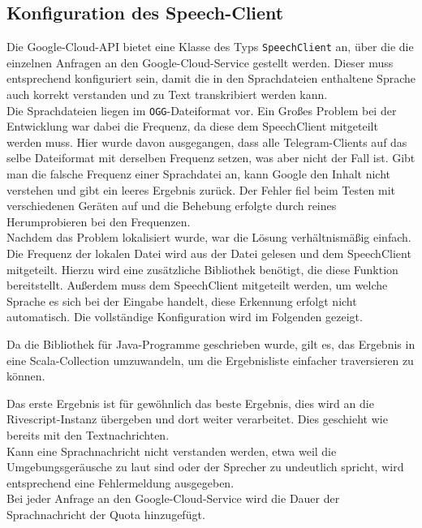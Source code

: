 \subsection{Konfiguration des Speech-Client}
Die Google-Cloud-API bietet eine Klasse des Typs \texttt{SpeechClient} an, über die die einzelnen Anfragen an den Google-Cloud-Service gestellt werden. Dieser muss entsprechend konfiguriert sein, damit die in den Sprachdateien enthaltene Sprache auch korrekt verstanden und zu Text transkribiert werden kann. \\
Die Sprachdateien liegen im \texttt{OGG}-Dateiformat vor. Ein Großes Problem bei der Entwicklung war dabei die Frequenz, da diese dem SpeechClient mitgeteilt werden muss. Hier wurde davon ausgegangen, dass alle Telegram-Clients auf das selbe Dateiformat mit derselben Frequenz setzen, was aber nicht der Fall ist. Gibt man die falsche Frequenz einer Sprachdatei an, kann Google den Inhalt nicht verstehen und gibt ein leeres Ergebnis zurück. Der Fehler fiel beim Testen mit verschiedenen Geräten auf und die Behebung erfolgte durch reines Herumprobieren bei den Frequenzen. \\
Nachdem das Problem lokalisiert wurde, war die Lösung verhältnismäßig einfach. Die Frequenz der lokalen Datei wird aus der Datei gelesen und dem SpeechClient mitgeteilt. Hierzu wird eine zusätzliche Bibliothek benötigt, die diese Funktion bereitstellt. Außerdem muss dem SpeechClient mitgeteilt werden, um welche Sprache es sich bei der Eingabe handelt, diese Erkennung erfolgt nicht automatisch. Die vollständige Konfiguration wird im Folgenden gezeigt.



Da die Bibliothek für Java-Programme geschrieben wurde, gilt es, das Ergebnis in eine Scala-Collection umzuwandeln, um die Ergebnisliste einfacher traversieren zu können.

Das erste Ergebnis ist für gewöhnlich das beste Ergebnis, dies wird an die Rivescript-Instanz übergeben und dort weiter verarbeitet. Dies geschieht wie bereits mit den Textnachrichten. \\
Kann eine Sprachnachricht nicht verstanden werden, etwa weil die Umgebungsgeräusche zu laut sind oder der Sprecher zu undeutlich spricht, wird entsprechend eine Fehlermeldung ausgegeben. \\
Bei jeder Anfrage an den Google-Cloud-Service wird die Dauer der Sprachnachricht der Quota hinzugefügt.
